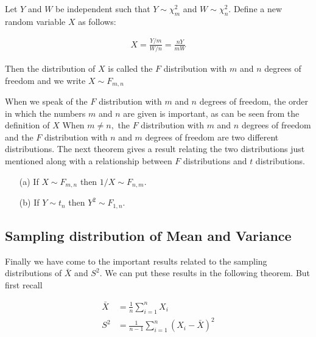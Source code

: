 \documentclass[ 11pt,%
				a4paper,%
				twoside,%
				headinclude,%
				footinclude = true,%
				cleardoublepage = empty,%
				reqno]{scrbook}
\begin{document}
\begin{definition}
Let $Y$ and $W$ be independent such that ${Y \sim \chi^{2}_m}$ and $W \sim \chi^{2}_n$. Define a new random variable $X$ as follows:

\begin{align*}
  X=\frac{Y / m}{W / n}=\frac{n Y}{m W}
\end{align*}

Then the distribution of $X$ is called the $F$ distribution with $m$ and $n$ degrees of freedom and we write $X \sim F_{m, n}$
\end{definition}

\begin{remark}

When we speak of the $F$ distribution with $m$ and $n$ degrees of freedom, the order in which the numbers $m$ and $n$ are given is important, as can be seen from the definition of $X$  When $m \neq n,$ the $F$ distribution with $m$ and $n$ degrees of freedom and the $F$ distribution with $n$ and $m$ degrees of freedom are two different distributions. The next theorem gives a result relating the two distributions just mentioned along with a relationship between $F$ distributions and $t$ distributions.
  
\end{remark}



\begin{theorem}

\begin{itemize}
  \item[]
  \item[(a)] If $X \sim F_{m, n}$ then $1 / X \sim F_{n, m}$.

  \item[(b)] If $Y \sim t_n$ then $Y^{2} \sim F_{1,n}$.
\end{itemize}
 
  
\end{theorem}


\subsection{Sampling distribution of Mean and Variance}


Finally we have come to the important results related to the sampling distributions of $\bar{X}$ and $S^2$. We can put these results in the following theorem. But first recall 


\begin{align*}
  \bar{X}&=\frac{1}{n} \sum_{i=1}^{n} X_{i} \\
    S^{2}&=\frac{1}{n-1} \sum_{i=1}^{n}\left(X_{i}-\bar{X}\right)^{2}
\end{align*}
\end{document}

